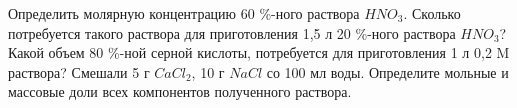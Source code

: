 \Qvery 
Определить молярную концентрацию 60 \%-ного раствора $HNO_{3}$. Сколько потребуется такого раствора для приготовления 1,5 л 20 \%-ного раствора $HNO_{3}$?
\endQvery
\Qvery 
Какой объем 80 \%-ной серной кислоты, потребуется для приготовления 1 л 0,2 M раствора?
\endQvery
\Qvery 
Смешали 5 г $CaCl_{2}$, 10 г $NaCl$ со 100 мл воды. Определите мольные и массовые доли всех компонентов полученного раствора.
\endQvery
